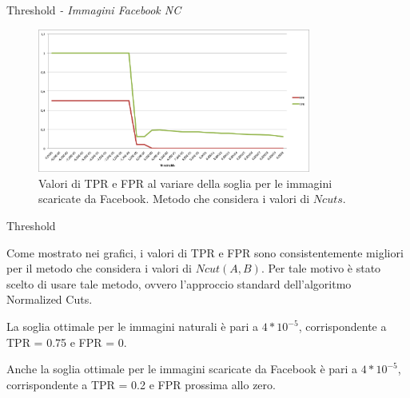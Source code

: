 \begin{tframe}{Threshold \emph{- Immagini Facebook NC}}

\begin{figure}[h]
\begin{center}
\includegraphics[width=0.8\textwidth]{../images/soglia_imgnat_fb_NC.png}
\end{center}
  \caption{Valori di TPR e FPR al variare della soglia per le immagini scaricate da Facebook. Metodo che considera i valori di $Ncuts$.}
\label{fig:soglia AC}
\end{figure}

\end{tframe}

\begin{tframe}{Threshold}

Come mostrato nei grafici, i valori di TPR e FPR sono consistentemente migliori per il metodo che considera i valori di $Ncut(A, B)$. Per tale motivo è stato scelto di usare tale metodo, ovvero l'approccio standard dell'algoritmo Normalized Cuts.

\vspace{0.2cm}

La soglia ottimale per le immagini naturali è pari a $4*10^{-5}$, corrispondente a TPR = 0.75 e FPR = 0.

\vspace{0.2cm}

Anche la soglia ottimale per le immagini scaricate da Facebook è pari a $4*10^{-5}$, corrispondente a TPR = 0.2 e FPR prossima allo zero.

\end{tframe}



